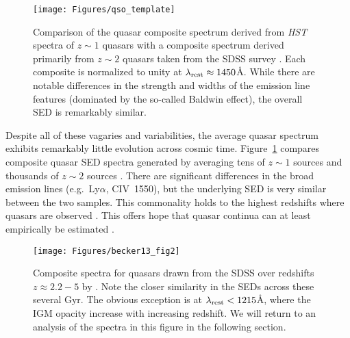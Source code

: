 \documentclass[graybox]{svmult}
\def\lya{Ly$\alpha$}
\begin{document}
%
\begin{figure}[b]
\sidecaption
\texttt{[image: Figures/qso\_template]}
%
%
\caption{Comparison of the quasar composite spectrum derived
from {\it HST} spectra of $z \sim 1$ quasars 
\cite[]{telfer02} with a composite spectrum derived
primarily from $z \sim 2$ quasars taken from the SDSS survey
\cite[]{vanden01}.  Each composite is normalized to unity
at $\lambda_{\rm rest} \approx 1450$\AA.
While there are notable differences in the
strength and widths of the emission line features (dominated
by the so-called Baldwin effect), the overall SED is remarkably
similar.  
}
\label{fig:qso_template}       %
\end{figure}



Despite all of these vagaries and variabilities, the average
quasar spectrum exhibits remarkably little evolution across
cosmic time.  Figure~\ref{fig:qso_template}
compares composite quasar SED spectra generated by
averaging tens of $z \sim 1$ sources \cite{telfer02}
and thousands of $z \sim 2$ sources \cite{vanden01}.
There are significant differences in the broad emission
lines (e.g.\ \lya, CIV~1550), but the underlying
SED is very similar between the two samples.  This commonality
holds to the highest redshifts where quasars are
observed \cite[Figure~\ref{fig:becker13_fig2}][]{becker+13}.
This offers hope that quasar continua can at least
empirically be estimated \cite{new_paper_by_AZ_guy}.



%
\begin{figure}[b]
\sidecaption
\texttt{[image: Figures/becker13\_fig2]}
%
%
\caption{Composite spectra for quasars drawn
from the SDSS over redshifts $z \approx 2.2-5$
by \cite{becker+13}.  Note the closer similarity
in the SEDs across these several Gyr.  The obvious
exception is at $\lambda_{\rm rest} < 1215$\AA, where
the IGM opacity increase with increasing redshift. 
We will return to an analysis of the spectra in this
figure in the following section.
}
\label{fig:becker13_fig2}       %
\end{figure}
\end{document}
